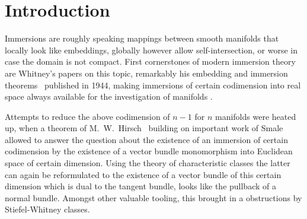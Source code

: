 % 

\chapter*{Introduction} %


Immersions are roughly speaking mappings between smooth
manifolds that locally look like embeddings, globally however
allow self-intersection, or worse in case the domain is not compact.
First cornerstones of modern immersion theory are Whitney's papers on this
topic, remarkably his embedding and immersion
theorems~\cite{whitneyimmersiontheorem} published in 1944, making
immersions of certain codimension into real space always available for the
investigation of manifolds
\cite{immersiontheoryhistory,hirsch}.

Attempts to reduce the above codimension of $n-1$ for $n$ manifolds
were heated up, when a theorem of
M.~W.~Hirsch~\cite{hirschimmersions} building on important work of
Smale allowed to answer the question about the existence of an
immersion of certain codimension by the 
existence of a vector bundle monomorphism into Euclidean space of
certain dimension.
Using the theory of characteristic classes the latter can again be
reformulated to the existence of a vector bundle of this certain
dimension which is dual to the tangent bundle, \idest looks
like the pullback of a normal bundle.
Amongst other valuable tooling, this brought in a obstructions by
Stiefel-Whitney classes.

